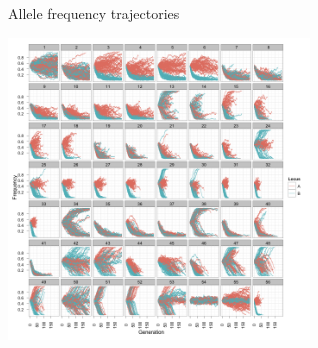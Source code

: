 \documentclass{beamer}
\begin{document}
\begin{frame}{Allele frequency trajectories}
\begin{center}
\includegraphics[width=8cm]{sup_allelefreq_sim.png}
\end{center}
\end{frame}
\end{document}
